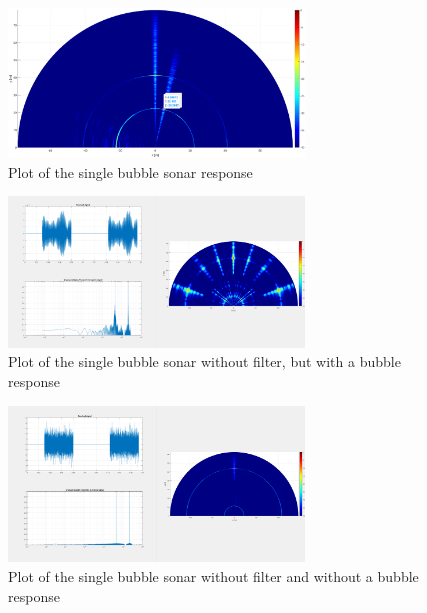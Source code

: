 \documentclass[11pt]{article}
\begin{document}
\begin{figure} [H]
    \centering
    \includegraphics[width=0.7\textwidth]{figures/single-bubble_sonar-resp.eps}
    \caption{Plot of the single bubble sonar response}
    \label{fig:single-bubble_sonar-resp}
\end{figure}

\begin{figure} [H]
    \centering
    \includegraphics[width=0.7\textwidth]{figures/sonar-nofilter-bubble.png}
    \caption{Plot of the single bubble sonar without filter, but with a bubble response}
    \label{fig:single-bubble_sonar-nofilter-bubble}
\end{figure}

\begin{figure} [H]
    \centering
    \includegraphics[width=0.7\textwidth]{figures/sonar-nofilter-nobubble.png}
    \caption{Plot of the single bubble sonar without filter and without a bubble response}
    \label{fig:single-bubble_sonar-nofilter-nobubble}
\end{figure}
\end{document}
